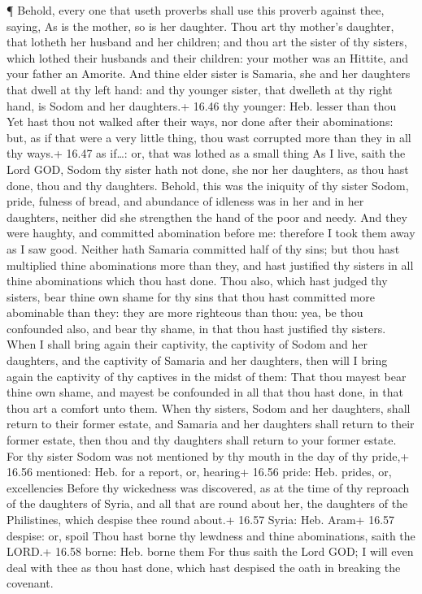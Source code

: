  ¶ Behold, every one that useth proverbs shall use this
proverb against thee, saying, As is the mother, so is her daughter.
 Thou art thy mother's daughter, that lotheth her husband
and her children; and thou art the sister of thy sisters, which lothed
their husbands and their children: your mother was an Hittite, and your
father an Amorite.  And thine elder sister is Samaria, she
and her daughters that dwell at thy left hand: and thy younger sister,
that dwelleth at thy right hand, is Sodom and her daughters.+ 16.46 thy
younger: Heb. lesser than thou  Yet hast thou not walked
after their ways, nor done after their abominations: but, as if that
were a very little thing, thou wast corrupted more than they in all thy
ways.+ 16.47 as if\ldots: or, that was lothed as a small thing
 As I live, saith the Lord GOD, Sodom thy sister hath not
done, she nor her daughters, as thou hast done, thou and thy daughters.
 Behold, this was the iniquity of thy sister Sodom, pride,
fulness of bread, and abundance of idleness was in her and in her
daughters, neither did she strengthen the hand of the poor and needy.
 And they were haughty, and committed abomination before
me: therefore I took them away as I saw good.  Neither hath
Samaria committed half of thy sins; but thou hast multiplied thine
abominations more than they, and hast justified thy sisters in all thine
abominations which thou hast done.  Thou also, which hast
judged thy sisters, bear thine own shame for thy sins that thou hast
committed more abominable than they: they are more righteous than thou:
yea, be thou confounded also, and bear thy shame, in that thou hast
justified thy sisters.  When I shall bring again their
captivity, the captivity of Sodom and her daughters, and the captivity
of Samaria and her daughters, then will I bring again the captivity of
thy captives in the midst of them:  That thou mayest bear
thine own shame, and mayest be confounded in all that thou hast done, in
that thou art a comfort unto them.  When thy sisters, Sodom
and her daughters, shall return to their former estate, and Samaria and
her daughters shall return to their former estate, then thou and thy
daughters shall return to your former estate.  For thy
sister Sodom was not mentioned by thy mouth in the day of thy pride,+
16.56 mentioned: Heb. for a report, or, hearing+ 16.56 pride: Heb.
prides, or, excellencies  Before thy wickedness was
discovered, as at the time of thy reproach of the daughters of Syria,
and all that are round about her, the daughters of the Philistines,
which despise thee round about.+ 16.57 Syria: Heb. Aram+ 16.57 despise:
or, spoil  Thou hast borne thy lewdness and thine
abominations, saith the LORD.+ 16.58 borne: Heb. borne them
 For thus saith the Lord GOD; I will even deal with thee as
thou hast done, which hast despised the oath in breaking the covenant.

